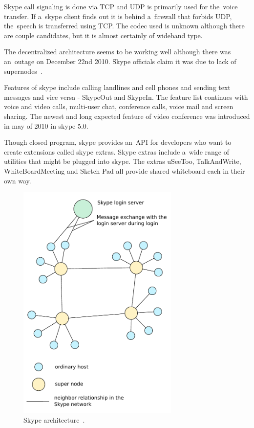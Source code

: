 Skype call signaling is done via TCP and UDP is primarily used for the~voice transfer. If a~skype client finds out it is behind a~firewall that forbids UDP, the~speech is transferred using TCP. The codec used is unknown although there are couple candidates, but it is almost certainly of wideband type. 

The decentralized architecture seems to be working well although there was an~outage on December 22nd 2010. Skype officials claim it was due to lack of supernodes~\cite{skypeOutage}.  


Features of skype include calling landlines and cell phones and sending text messages and vice versa - SkypeOut and SkypeIn. The feature list continues with voice and video calls, multi-user chat, conference calls, voice mail and screen sharing. The newest and long expected feature of video conference was introduced in may of 2010 in skype 5.0. 

Though closed program, skype provides an~API for developers who want to create extensions called skype extras. Skype extras include a~wide range of utilities that might be plugged into skype. The extras uSeeToo, TalkAndWrite, WhiteBoardMeeting and Sketch Pad all provide shared whiteboard each in their own way.    

\begin{figure}[ht]
	\begin{center}
	\includegraphics[width=8cm]{fig/skype-architecture.pdf}
	\caption{Skype architecture~\cite{skypeProtocolAnalysis}.}
	\label{fig:skypeArchitecture}
\end{center}
\end{figure}

